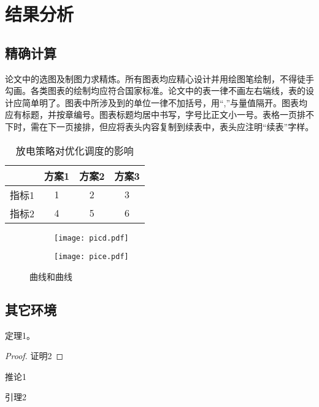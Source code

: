 \documentclass[bachelor]{NCEPU-thesis}
\begin{document}
\chapter{结果分析}

\section{精确计算}
论文中的选图及制图力求精炼。所有图表均应精心设计并用绘图笔绘制，不得徒手勾画。各类图表的绘制均应符合国家标准。论文中的表一律不画左右端线，表的设计应简单明了。图表中所涉及到的单位一律不加括号，用“,”与量值隔开。图表均应有标题，并按章编号。图表标题均居中书写，字号比正文小一号。表格一页排不下时，需在下一页接排，但应将表头内容复制到续表中，表头应注明“续表”字样。

\begin{table}[h]
\caption{放电策略对优化调度的影响}
\begin{tabular}{cccc}
    \toprule
          & 方案1   & 方案2   & 方案3 \\
    \midrule
    指标1   & 1     & 2     & 3 \\
    指标2   & 4     & 5     & 6 \\
    \bottomrule
    \end{tabular}%
\label{tablea}
\end{table}

\begin{figure}[h]
\begin{subfigure}[b]{0.49\linewidth}
\texttt{[image: picd.pdf]}
\label{picd}
\end{subfigure}
\begin{subfigure}[b]{0.49\linewidth}
\texttt{[image: pice.pdf]}
\label{pice}
\end{subfigure}
\caption{曲线和曲线}
\label{fig2}
\end{figure}

\section{其它环境}
\begin{theorem}
定理1。
\end{theorem}
\begin{proof}
证明2
\end{proof}
\begin{corollary}
推论1
\end{corollary}
\begin{lemma}
引理2
\end{lemma}
\end{document}
